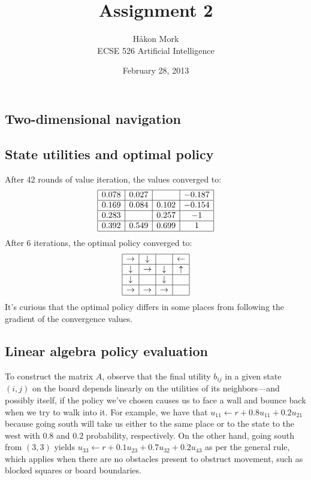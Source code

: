 \documentclass[letterpaper, 10pt]{article}
\title{\textbf{Assignment 2}}
\author{Håkon Mork \\ ECSE 526 Artificial Intelligence}
\date{February 28, 2013}
\begin{document}
\maketitle
\noindent
\begin{multicols*}{2}

\section{Two-dimensional navigation}
\subsection{State utilities and optimal policy}
After 42 rounds of value iteration, the values converged to:
\[
	\begin{array}{|c|c|c|c|}
		\hline
		0.078 & 0.027 &       & -0.187 \\
		\hline
		0.169 & 0.084 & 0.102 & -0.154 \\
		\hline
		0.283 &       & 0.257 & -1 \\
		\hline
		0.392 & 0.549 & 0.699 & 1 \\
		\hline
	\end{array}
\]
After 6 iterations, the optimal policy converged to:
\[
	\begin{array}{|c|c|c|c|}
		\hline
		\rightarrow & \downarrow &       & \leftarrow \\
		\hline
		\downarrow & \rightarrow & \downarrow & \uparrow \\
		\hline
		\downarrow &       & \downarrow &  \\
		\hline
		\rightarrow & \rightarrow & \rightarrow & \\
		\hline
	\end{array}
\]
It's curious that the optimal policy differs in some places from following the gradient of the convergence values.

\subsection{Linear algebra policy evaluation}
To construct the matrix $A$, observe that the final utility $b_{ij}$ in a given state $(i, j)$ on the board depends linearly on the utilities of its neighbors---and possibly itself, if the policy we've chosen causes us to face a wall and bounce back when we try to walk into it. 
For example, we have that 
$u_{11} \gets r + 0.8 u_{11} + 0.2 u_{21}$ because going south will take us either to the same place or to the state to the west with $0.8$ and $0.2$ probability, respectively. 
On the other hand, 
going south from $(3,3)$ yields $u_{33} \gets r + 0.1 u_{23} + 0.7 u_{32} + 0.2 u_{43}$ as per the general rule, which applies when there are no obstacles present to obstruct movement, such as blocked squares or board boundaries. 


\end{multicols*}
\end{document}
